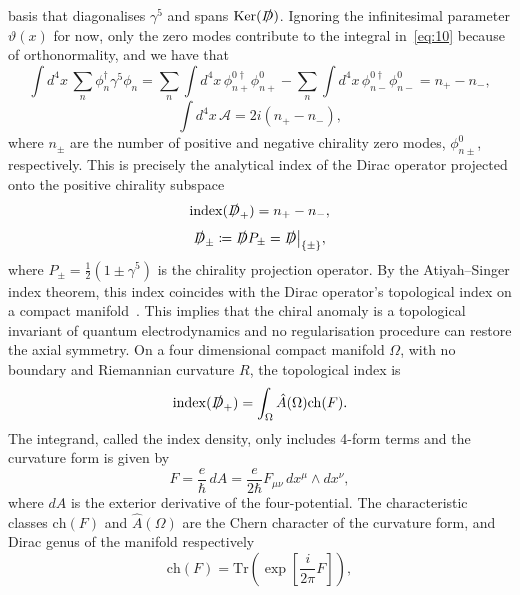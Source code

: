 \documentclass[11pt, a4paper]{article}
\begin{document}
basis that diagonalises $\gamma^5$ and spans $\mathrm{Ker}(\slashed{D})$.
Ignoring the infinitesimal parameter $\vartheta(x)$ for now, only the zero modes contribute
to the integral in~\eqref{eq:10} because of orthonormality, and we have that
\begin{equation}
  \int{d^4x\, \sum_n{\phi^\dagger_n\gamma^5\phi_n}}
  = \sum_n{\int{d^4x\,\phi^{0\dagger}_{n+}\phi^0_{n+}}}
  -\sum_n{\int{d^4x\,\phi^{0\dagger}_{n-}\phi^0_{n-}}} = n_+ - n_-,
\end{equation}
\begin{equation}
  \int{d^4x\, \mathcal{A}} = 2i(n_+ - n_-),
\end{equation}
where $n_\pm$ are the number of positive and negative chirality zero modes, $\phi^0_{n\pm}$,
respectively. This is precisely the analytical index of the Dirac operator 
projected onto the positive chirality subspace
\begin{equation}
  \mathrm{index}(\slashed{D}_{+}) = n_+ - n_-, 
\end{equation}
\begin{equation}
  \slashed{D}_\pm \coloneq \slashed{D}P_{\pm} = \slashed{D}\big|_{\{\pm\}},
\end{equation}
where $P_{\pm} = \frac{1}{2}(1 \pm \gamma^5)$ is the chirality
projection operator.
By the Atiyah–Singer index theorem, this index coincides with the Dirac operator's 
topological index on a compact manifold~\cite{Atiyah-Singer}.
This implies that the chiral anomaly is a topological invariant of quantum electrodynamics
and no regularisation procedure can restore the axial symmetry.
On a four dimensional compact manifold $\Omega$, with no boundary and
Riemannian curvature $R$, the topological index is~\cite{AST-Alvarez-Gaume,DiffGeomGauge}
\begin{equation}
  \mathrm{index}(\slashed{D}_+ ) =  \int_{\Omega}{\hat{A}(\Omega)\mathrm{ch}(F)}.
\end{equation}
The integrand, called the index density, only includes 4-form terms and the curvature
form is given by
\begin{equation}
F = \frac{e}{\hbar}\,dA = \frac{e}{2\hbar}F_{\mu\nu}\, dx^\mu \wedge dx^\nu,
\end{equation}
where $dA$ is the exterior derivative of the four-potential.
The characteristic classes
$\mathrm{ch}(F)$ and $\hat{A}(\Omega)$ are the Chern character
of the curvature form, and Dirac genus of the manifold respectively
\begin{equation}
  \mathrm{ch}(F) = \mathrm{Tr}\left(\exp{\left[ \frac{i}{2\pi}F \right]}\right),
\end{equation}
\end{document}
